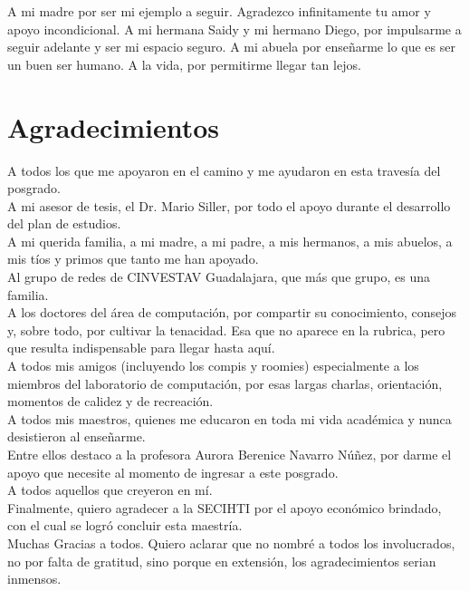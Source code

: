 \documentclass[12pt, letterpaper, oneside]{book}
\begin{document}
A mi madre por ser mi ejemplo a seguir. Agradezco infinitamente tu amor y apoyo incondicional.
A mi hermana Saidy y mi hermano Diego, por impulsarme a seguir adelante y ser mi espacio seguro. A mi abuela por enseñarme lo que es ser un buen ser humano. A la vida, por permitirme llegar tan lejos. 

\chapter*{Agradecimientos}\label{agradecimientos}

\noindent A todos los que me apoyaron en el camino y me ayudaron en esta travesía del posgrado.\\
A mi asesor de tesis, el Dr. Mario Siller, por todo el apoyo durante el desarrollo del plan de estudios.\\
A mi querida familia, a mi madre, a mi padre, a mis hermanos, a mis abuelos, a mis tíos y primos que tanto me han apoyado.\\
Al grupo de redes de CINVESTAV Guadalajara, que más que grupo, es una familia.\\
A los doctores del área de computación, por compartir su conocimiento, consejos y, sobre todo, por cultivar la tenacidad. Esa que no aparece en la rubrica, pero que resulta indispensable para llegar hasta aquí.\\
A todos mis amigos (incluyendo los compis y roomies) especialmente a los miembros del laboratorio de computación, por esas largas charlas, orientación, momentos de calidez y de recreación.\\
A todos mis maestros, quienes me educaron en toda mi vida académica y nunca desistieron al enseñarme.\\
Entre ellos destaco a la profesora Aurora Berenice Navarro Núñez, por darme el apoyo que necesite al momento de ingresar a este posgrado.\\
A todos aquellos que creyeron en mí.\\
Finalmente, quiero agradecer a la SECIHTI por el apoyo económico brindado, con el cual se logró concluir esta maestría.\\
Muchas Gracias a todos.
\vfill 
    \noindent 
    {Quiero aclarar que no nombré a todos los involucrados, no por falta de gratitud, sino porque en extensión, los agradecimientos serian inmensos.}\\

\tableofcontents
\listoffigures
\listoftables
\end{document}
